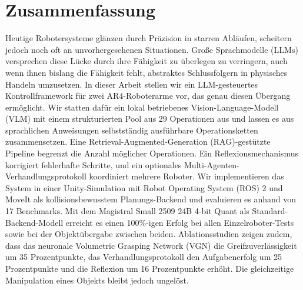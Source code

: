 \documentclass[
     12pt,
     a4paper,
     BCOR=10mm,
     DIV=14,
     listof=totoc,
     bibliography=totoc,
     parskip,
     twoside,
     headsepline
     ]{scrreprt}
\begin{document}
\section*{Zusammenfassung}
Heutige Robotersysteme glänzen durch Präzision in starren Abläufen, scheitern jedoch noch oft an unvorhergesehenen Situationen. Große Sprachmodelle (LLMs) versprechen diese Lücke durch ihre Fähigkeit zu überlegen zu verringern, auch wenn ihnen bislang die Fähigkeit fehlt, abstraktes Schlussfolgern in physisches Handeln umzusetzen. In dieser Arbeit stellen wir ein LLM-gesteuertes Kontrollframework für zwei AR4-Roboterarme vor, das genau diesen Übergang ermöglicht. Wir statten dafür ein lokal betriebenes Vision-Language-Modell (VLM) mit einem strukturierten Pool aus 29 Operationen aus und lassen es aus sprachlichen Anweisungen selbstständig ausführbare Operationsketten zusammensetzen. Eine Retrieval-Augmented-Generation (RAG)-gestützte Pipeline begrenzt die Anzahl möglicher Operationen. Ein Reflexionsmechanismus korrigiert fehlerhafte Schritte, und ein optionales Multi-Agenten-Verhandlungsprotokoll koordiniert mehrere Roboter. Wir implementieren das System in einer Unity-Simulation mit Robot Operating System (ROS) 2 und MoveIt als kollisionsbewusstem Planungs-Backend und evaluieren es anhand von 17 Benchmarks. Mit dem Magistral Small 2509 24B 4-bit Quant als Standard-Backend-Modell erreicht es einen 100\%-igen Erfolg bei allen Einzelroboter-Tests sowie bei der Objektübergabe zwischen beiden. Ablationsstudien zeigen zudem, dass das neuronale Volumetric Grasping Network (VGN) die Greifzuverlässigkeit um 35 Prozentpunkte, das Verhandlungsprotokoll den Aufgabenerfolg um 25 Prozentpunkte und die Reflexion um 16 Prozentpunkte erhöht. Die gleichzeitige Manipulation eines Objekts bleibt jedoch ungelöst.

\cleardoublepage

\tableofcontents
\clearpage

\printnoidxglossary[
	type=\acronymtype,
	title=List of Abbreviations,
	nonumberlist,
	style=listdotted,
	nogroupskip,
]

\cleardoublepage


\cleardoublepage

\glsresetall

\end{document}
